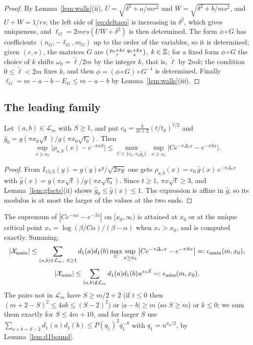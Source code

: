 \begin{proof}
By Lemma~\ref{lem:walls}(ii), $U=\sqrt{\delta^2+a/mr^2}$ and $W=\sqrt{\delta^2+b/ms^2}$, and $U+W=1/rs$; the left side of \eqref{eq:deltaeq} is increasing in $\delta^2$, which gives uniqueness, and $\ell_G=2mrs(UW+\delta^2)$ is then determined. The form $\phi\circ G$ has coefficients $(n_G,-\ell_G,m_G)$ up to the order of the variables, so it is determined; given $(r,s)$, the matrices $G$ are $\begin{psmallmatrix}p_0+kr&q_0+ks\\r&s\end{psmallmatrix}$, $k\in\mathbb{Z}$; for a fixed form $\phi\circ G$ the choice of $k$ shifts $\omega_0=\tilde\ell/2m$ by the integer $k$, that is, $\tilde\ell$ by $2mk$; the condition $0\le\tilde\ell<2m$ fixes $k$, and then $\phi=(\phi\circ G)\circ G^{-1}$ is determined. Finally $\ell_G=m-a-b-E_G\le m-a-b$ by Lemma~\ref{lem:walls}(iii).
\end{proof}

\subsection{The leading family}
\begin{lemma}\label{lem:mainerr}
Let $(a,b)\in\mathcal L_m$ with $S\ge1$, and put $c_0=\frac k{m+2}(t/t_0)^{7/2}$ and $\hat g_0=g(\pi x_0\sqrt t)/g(\pi x_0\sqrt{t_0})$. Then
\[
\sup_{x\ge x_0}\big|\rho_{a,b}(x)-e^{-\pi xS}\big|\le\max_{C\in\{c_0,\,c_0\hat g_0\}}\ \sup_{x\ge x_0}\big|Ce^{-\pi\Delta_sx}-e^{-\pi Sx}\big| .
\]
\end{lemma}

\begin{proof}
From $I_{15/2}(y)=g(y)e^y/\sqrt{2\pi y}$ one gets $\rho_{a,b}(x)=c_0\,\hat g(x)\,e^{-\pi\Delta_sx}$ with $\hat g(x)=g(\pi x\sqrt t)/g(\pi x\sqrt{t_0})$. Since $t\ge1$, $\pi x\sqrt t\ge3$, and Lemma~\ref{lem:gfacts}(ii) shows $\hat g_0\le\hat g(x)\le1$. The expression is affine in $\hat g$, so its modulus is at most the larger of the values at the two ends.
\end{proof}

The supremum of $|Ce^{-\alpha x}-e^{-\beta x}|$ on $[x_0,\infty)$ is attained at $x_0$ or at the unique critical point $x_*=\log(\beta/C\alpha)/(\beta-\alpha)$ when $x_*>x_0$, and is computed exactly. Summing,
\begin{equation}\label{eq:Xmain}
|\mathcal X_{\rm main}|\le\sum_{(a,b)\in\mathcal L_m,\ S\ge1}d_1(a)d_1(b)\max_{C}\sup_{x\ge x_0}\big|Ce^{-\pi\Delta_sx}-e^{-\pi Sx}\big|=:\epsilon_{\rm main}(m,x_0),
\end{equation}
\begin{equation}\label{eq:Xmiss}
|\mathcal X_{\rm miss}|\le\sum_{(a,b)\notin\mathcal L_m}d_1(a)d_1(b)u^{x_0S}=:\epsilon_{\rm miss}(m,x_0).
\end{equation}
The pairs not in $\mathcal L_m$ have $S\ge m/2+2$ (if $t\le0$ then $(m+2-S)^2\le4ab\le(S-2)^2$) or $|a-b|\ge m$ (so $S\ge m$) or $k\le0$; we sum them exactly for $S\le4m+10$, and for larger $S$ use $\sum_{a+b=S-2}d_1(a)d_1(b)\le P(q_1)^2q_1^{-S}$ with $q_1=u^{x_0/2}$, by Lemma~\ref{lem:d1bound}.

